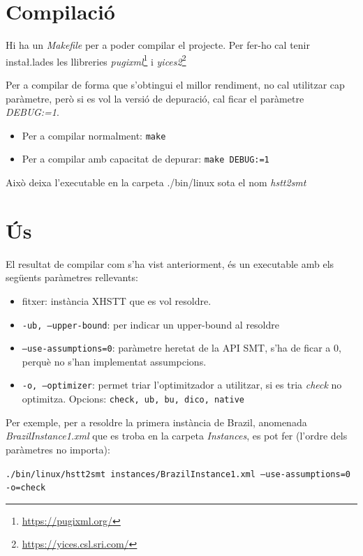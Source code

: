 \documentclass[11pt,a4paper,twoside]{report}
\begin{document}
  \section{Compilació}

  Hi ha un \textit{Makefile} per a poder compilar el projecte. Per fer-ho cal tenir insta\l.lades les llibreries \textit{pugixml}\footnote{\url{https://pugixml.org/}} i \textit{yices2}\footnote{\url{https://yices.csl.sri.com/}}
  
  Per a compilar de forma que s'obtingui el millor rendiment, no cal utilitzar cap paràmetre, però si es vol la versió de depuració, cal ficar el paràmetre \textit{DEBUG:=1}.
  \begin{center}
  \begin{itemize}
    \item Per a compilar normalment: \texttt{make}
    \item Per a compilar amb capacitat de depurar: \texttt{make DEBUG:=1}
  \end{itemize}
  \end{center}

  Això deixa l'executable en la carpeta ./bin/linux sota el nom \textit{hstt2smt}


  \section{Ús}
  
  El resultat de compilar com s'ha vist anteriorment, és un executable amb els següents paràmetres rellevants:
  \begin{itemize}
    \item fitxer: instància XHSTT que es vol resoldre.
    \item \texttt{-ub, --upper-bound}: per indicar un upper-bound al resoldre
    \item \texttt{--use-assumptions=0}: paràmetre heretat de la API SMT, s'ha de ficar a 0, perquè no s'han implementat assumpcions.
    \item \texttt{-o, --optimizer}: permet triar l'optimitzador a utilitzar, si es tria \textit{check} no optimitza. Opcions: \texttt{check, ub, bu, dico, native}
  \end{itemize}

  Per exemple, per a resoldre la primera instància de Brazil, anomenada \textit{BrazilInstance1.xml} que es troba en la carpeta \textit{Instances}, es pot fer (l'ordre dels paràmetres no importa):

  \begin{center}
    \texttt{./bin/linux/hstt2smt instances/BrazilInstance1.xml --use-assumptions=0 -o=check}
  \end{center}
  
  
\end{document}
